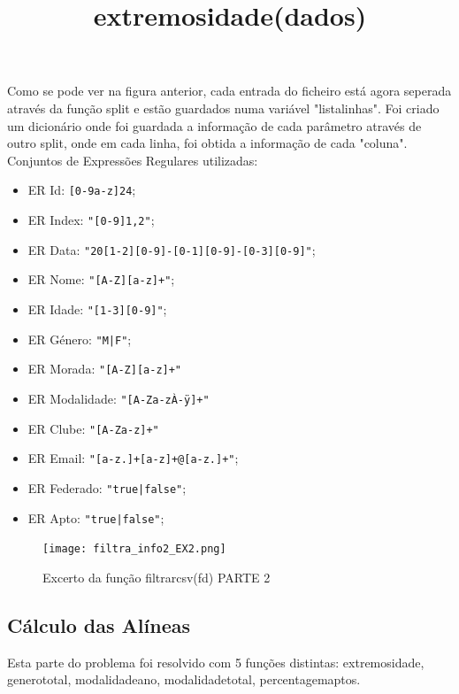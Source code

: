 \documentclass[11pt,a4paper]{report}%
\begin{document}
Como se pode ver na figura anterior, cada entrada do ficheiro está agora seperada através da função split e estão guardados numa variável "lista\textunderscore linhas". Foi criado um dicionário onde foi guardada a informação de cada parâmetro através de outro split, onde em cada linha, foi obtida a informação de cada "coluna".\\

Conjuntos de Expressões Regulares utilizadas:

\begin{itemize}
  \item ER Id: \texttt{[0-9a-z]{24}};
  \item ER Index: \texttt{"[0-9]{1,2}"};
  \item ER Data: \texttt{"20[1-2][0-9]-[0-1][0-9]-[0-3][0-9]"};
  \item ER Nome: \texttt{"[A-Z][a-z]+"};
  \item ER Idade: \texttt{"[1-3][0-9]"};
  \item ER Género: \texttt{"M|F"};
  \item ER Morada: \texttt{"[A-Z][a-z]+"}
  \item ER Modalidade: \texttt{"[A-Za-zÀ-ÿ]+"}
  \item ER Clube: \texttt{"[A-Za-z]+"}
  \item ER Email: \texttt{"[a-z.]+[a-z]+@[a-z.]+"};
  \item ER Federado: \texttt{"true|false"};
  \item ER Apto: \texttt{"true|false"};
\end{itemize}


\begin{figure}[htbp]
\centerline{\texttt{[image: filtra\_info2\_EX2.png]}}
\caption{Excerto da função filtrar\textunderscore csv(fd) PARTE 2}
\label{fig}
\end{figure} 



\subsection{Cálculo das Alíneas} \label{subsec:indicadoresCalc}
Esta parte do problema foi resolvido com 5 funções distintas: extremos\textunderscore idade, genero\textunderscore total, modalidade\textunderscore ano, modalidade\textunderscore total, percentagem\textunderscore aptos.\\

\title{\textbf{extremos\textunderscore idade(dados)}}
\end{document}

